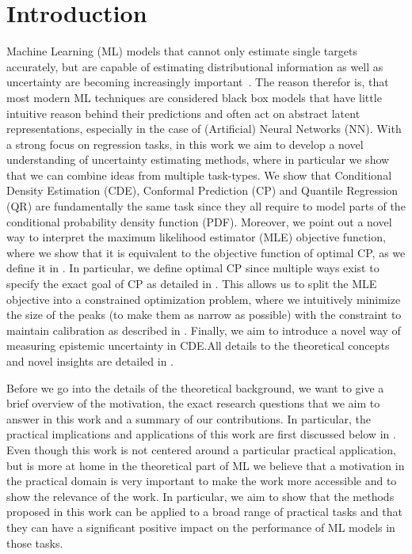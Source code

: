 
\chapter{Introduction}\label{chap:introduction}

Machine Learning (ML) models that cannot only estimate single targets accurately, but are capable of estimating distributional information as well as uncertainty are becoming increasingly important~\cite{hullermeier_aleatoric_2021, gawlikowski2023survey}. The reason therefor is, that most modern ML techniques are considered black box models that have little intuitive reason behind their predictions and often act on abstract latent representations, especially in the case of (Artificial) Neural Networks (NN). With a strong focus on regression tasks, in this work we aim to develop a novel understanding of uncertainty estimating methods, where in particular we show that we can combine ideas from multiple task-types. We show that Conditional Density Estimation (CDE), Conformal Prediction (CP) and Quantile Regression (QR) are fundamentally the same task since they all require to model parts of the conditional probability density function (PDF). Moreover, we point out a novel way to interpret the maximum likelihood estimator (MLE) objective function, where we show that it is equivalent to the objective function of optimal CP, as we define it in . In particular, we define optimal CP since multiple ways exist to specify the exact goal of CP as detailed in . This allows us to split the MLE objective into a constrained optimization problem, where we intuitively minimize the size of the peaks (to make them as narrow as possible) with the constraint to maintain calibration as described in . Finally, we aim to introduce a novel way of measuring epistemic uncertainty in CDE.\@ All details to the theoretical concepts and novel insights are detailed in .

Before we go into the details of the theoretical background, we want to give a brief overview of the motivation, the exact research questions that we aim to answer in this work and a summary of our contributions. In particular, the practical implications and applications of this work are first discussed below in . Even though this work is not centered around a particular practical application, but is more at home in the theoretical part of ML we believe that a motivation in the practical domain is very important to make the work more accessible and to show the relevance of the work. In particular, we aim to show that the methods proposed in this work can be applied to a broad range of practical tasks and that they can have a significant positive impact on the performance of ML models in those tasks.

